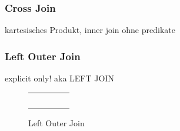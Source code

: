 \documentclass[a4paper]{article}
\begin{document}
\subsubsection{Cross Join}
kartesisches Produkt, inner join ohne predikate

\subsubsection{Left Outer Join}
explicit only!
aka LEFT JOIN

\begin{figure}[H]
\centering
{}
\end{figure}

\begin{figure}[H]
\centering
  \begin{tabular}{| c | c | c | c | c |}
    \hline
    \cellcolor{cell} & \cellcolor{cell} & \cellcolor{cell} &  \cellcolor{cell-odd} & \cellcolor{cell-odd} \\ \hline
    \cellcolor{cell} & \cellcolor{cell} & \cellcolor{cell} &  \cellcolor{cell-odd} & \cellcolor{cell-odd} \\ \hline
    \cellcolor{cell} & \cellcolor{cell} & \cellcolor{cell} &  \cellcolor{cell-odd} & \cellcolor{cell-odd} \\ \hline
    \cellcolor{cell} & \cellcolor{cell} & \cellcolor{cell} & & \\ \hline
    \cellcolor{cell} & \cellcolor{cell} & \cellcolor{cell} & & \\ \hline
    \cellcolor{cell} & \cellcolor{cell} & \cellcolor{cell} & & \\ \hline
  \end{tabular}
\caption{Left Outer Join}
\end{figure}
\end{document}

